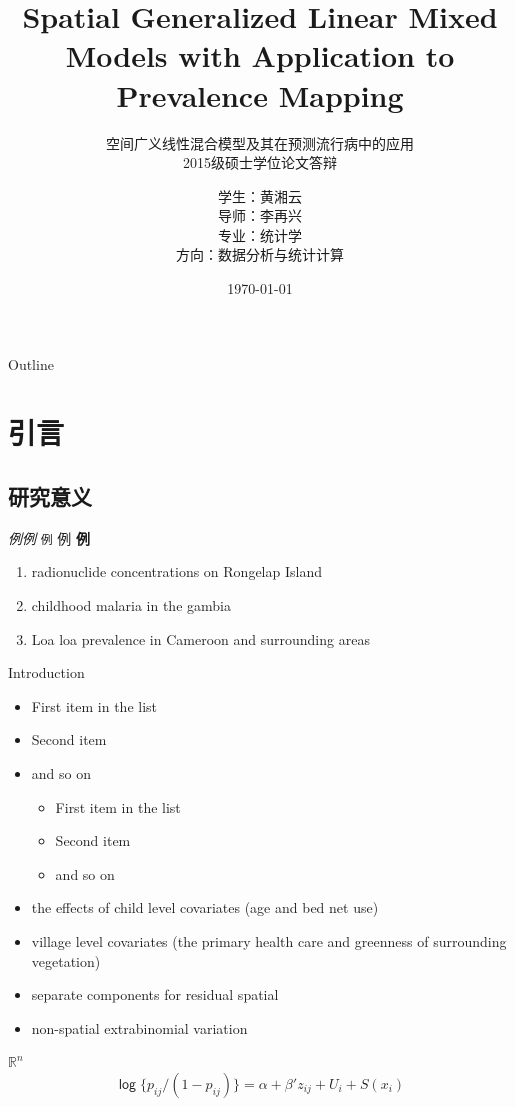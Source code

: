 \documentclass[11pt,compress,xcolor=x11names,UTF8]{beamer}
\title[Spatial Generalized Linear Mixed Models]{Spatial Generalized Linear Mixed Models with Application to Prevalence Mapping}
\subtitle{空间广义线性混合模型及其在预测流行病中的应用\\ 2015级硕士学位论文答辩}
\author[黄湘云]{学生：黄湘云 \\ 导师：李再兴 \\ 专业：统计学 \\ 方向：数据分析与统计计算}
\institute[中国矿业大学（北京）]{理学院\\ 计算数学与统计系}
\date{\today}
\begin{document}
\maketitle
\begin{frame}{Outline}
\tableofcontents
\end{frame}

\section{引言}

\subsection{研究意义}

\begin{frame}{}
\emph{例}\textit{例} \texttt{例} \textsf{例} \textbf{例}
\begin{enumerate}
\item radionuclide concentrations on Rongelap Island
\item childhood malaria in the gambia
\item Loa loa prevalence in Cameroon and surrounding areas
\end{enumerate}

\end{frame}

\begin{frame}{Introduction}
\citet{Diggle2002}
\begin{itemize}
\item First item in the list
\item Second item
\item and so on
\begin{itemize}
\item First item in the list
\item Second item
\item and so on
\end{itemize}
\end{itemize}

\begin{itemize}
\item the effects of child level covariates (age and bed net use)
\item village level covariates (the primary health care and greenness of surrounding vegetation)
\item separate components for residual spatial
\item non-spatial extrabinomial variation
\end{itemize}
$\mathbb{R}^{n}$
$$ \mathsf{\log} \{p_{ij}/(1-p_{ij})\} =\alpha + \beta'z_{ij} + U_{i} + S(x_{i})$$

\end{frame}
\end{document}
